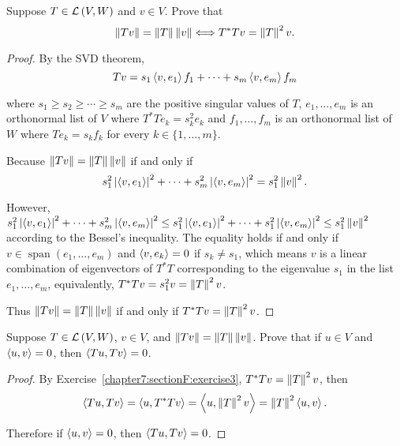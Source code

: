 \begin{exercise}\label{chapter7:sectionF:exercise3}
    Suppose $T\in\mathcal{L}\left({V,W}\right)$ and $v\in V$. Prove that
    \[
        \left\Vert{Tv}\right\Vert = \left\Vert{T}\right\Vert\left\Vert{v}\right\Vert \Longleftrightarrow T^{*}Tv = \left\Vert{T}\right\Vert^{2}v.
    \]
\end{exercise}

\begin{proof}
    By the SVD theorem,
    \[
        Tv = s_{1}\left\langle{v,e_{1}}\right\rangle f_{1} + \cdots + s_{m}\left\langle{v,e_{m}}\right\rangle f_{m}
    \]

    where $s_{1}\geq s_{2} \geq \cdots \geq s_{m}$ are the positive singular values of $T$, $e_{1}, \ldots, e_{m}$ is an orthonormal list of $V$ where $T^{*}Te_{k} = s_{k}^{2}e_{k}$ and $f_{1}, \ldots, f_{m}$ is an orthonormal list of $W$ where $Te_{k} = s_{k}f_{k}$ for every $k\in\{1,\ldots,m\}$.

    Because $\left\Vert{Tv}\right\Vert = \left\Vert{T}\right\Vert\left\Vert{v}\right\Vert$ if and only if
    \[
        s_{1}^{2}\left\vert{\left\langle{v,e_{1}}\right\rangle}\right\vert^{2} + \cdots + s_{m}^{2}\left\vert{\left\langle{v,e_{m}}\right\rangle}\right\vert^{2} = s_{1}^{2}\left\Vert{v}\right\Vert^{2}.
    \]

    However, $s_{1}^{2}\left\vert{\left\langle{v,e_{1}}\right\rangle}\right\vert^{2} + \cdots + s_{m}^{2}\left\vert{\left\langle{v,e_{m}}\right\rangle}\right\vert^{2} \leq s_{1}^{2}\left\vert{\left\langle{v,e_{1}}\right\rangle}\right\vert^{2} + \cdots + s_{1}^{2}\left\vert{\left\langle{v,e_{m}}\right\rangle}\right\vert^{2} \leq s_{1}^{2}\left\Vert{v}\right\Vert^{2}$ according to the Bessel's inequality. The equality holds if and only if $v\in\operatorname{span}(e_{1}, \ldots, e_{m})$ and $\left\langle{v,e_{k}}\right\rangle = 0$ if $s_{k}\ne s_{1}$, which means $v$ is a linear combination of eigenvectors of $T^{*}T$ corresponding to the eigenvalue $s_{1}$ in the list $e_{1}, \ldots, e_{m}$, equivalently, $T^{*}Tv = s_{1}^{2}v = \left\Vert{T}\right\Vert^{2}v$.

    Thus $\left\Vert{Tv}\right\Vert = \left\Vert{T}\right\Vert\left\Vert{v}\right\Vert$ if and only if $T^{*}Tv = \left\Vert{T}\right\Vert^{2}v$.
\end{proof}
\newpage

\begin{exercise}
    Suppose $T\in\mathcal{L}\left({V, W}\right)$, $v\in V$, and $\left\Vert{Tv}\right\Vert = \left\Vert{T}\right\Vert\left\Vert{v}\right\Vert$. Prove that if $u\in V$ and $\left\langle{u, v}\right\rangle = 0$, then $\left\langle{Tu, Tv}\right\rangle = 0$.
\end{exercise}

\begin{proof}
    By Exercise~\ref{chapter7:sectionF:exercise3}, $T^{*}Tv = \left\Vert{T}\right\Vert^{2}v$, then
    \[
        \left\langle{Tu, Tv}\right\rangle = \left\langle{u, T^{*}Tv}\right\rangle = \left\langle{u, \left\Vert{T}\right\Vert^{2}v}\right\rangle = \left\Vert{T}\right\Vert^{2}\left\langle{u, v}\right\rangle.
    \]

    Therefore if $\left\langle{u, v}\right\rangle = 0$, then $\left\langle{Tu, Tv}\right\rangle = 0$.
\end{proof}
\newpage

